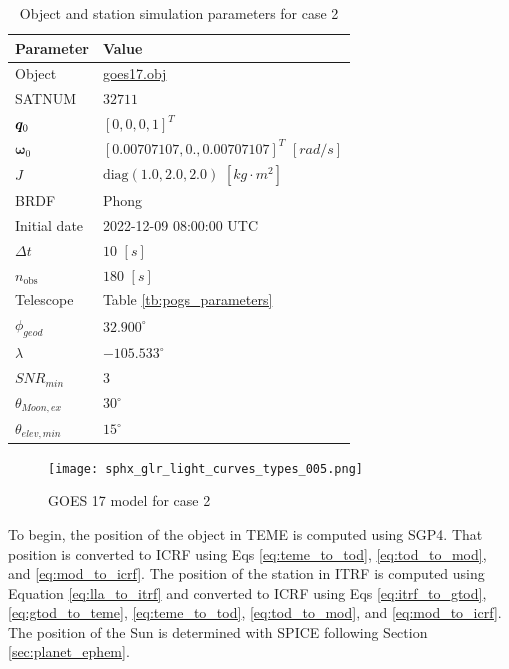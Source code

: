 \begin{table}[]
  \centering
  \caption{Object and station simulation parameters for case 2}
  \vspace*{6pt}
  \begin{tabular}{|l|l|}
  \hline
  \textbf{Parameter} & \textbf{Value} \\ \hline
  Object & \href{https://raw.githubusercontent.com/liamrobinson1/Light-Curve-Models/main/accurate_sats/matlib_goes17.obj}{goes17.obj} \\ \hline
  SATNUM & $32711$ \\ \hline
  $\bm{q}_0$ & $\left[ 0, 0, 0, 1 \right]^T$ \\ \hline
  $\boldsymbol{\omega}_0$ & $\left[ 0.00707107, 0.,         0.00707107 \right]^T$ $[rad/s]$ \\ \hline
  $J$ & $\mathrm{diag}\left( 1.0, 2.0, 2.0 \right)$ $\left[ kg \cdot m^2 \right]$ \\ \hline
  BRDF & Phong \\ \hline
  Initial date & 2022-12-09 08:00:00 UTC \\ \hline
  $\Delta t$ & $10$ $[s]$ \\ \hline
  $n_\mathrm{obs}$ & $180$ $[s]$ \\ \hline
  Telescope & Table \ref{tb:pogs_parameters} \\ \hline
  $\phi_{geod}$ & $32.900^\circ$ \\ \hline
  $\lambda$ & $-105.533^\circ$ \\ \hline
  $SNR_{min}$ & $3$ \\ \hline
  $\theta_{Moon,ex}$ & $30^\circ$ \\ \hline
  $\theta_{elev,min}$ & $15^\circ$ \\ \hline
  \end{tabular}
  \label{tb:case2_obj_props}
\end{table}

\begin{figure}[!htb]
  \centering
  \texttt{[image: sphx\_glr\_light\_curves\_types\_005.png]}
  \caption{GOES 17 model for case 2}
  \label{fig:case2_obj}
\end{figure}

To begin, the position of the object in TEME is computed using SGP4. That position is converted to ICRF using Eqs \ref{eq:teme_to_tod}, \ref{eq:tod_to_mod}, and \ref{eq:mod_to_icrf}. The position of the station in ITRF is computed using Equation \ref{eq:lla_to_itrf} and converted to ICRF using Eqs \ref{eq:itrf_to_gtod}, \ref{eq:gtod_to_teme}, \ref{eq:teme_to_tod}, \ref{eq:tod_to_mod}, and \ref{eq:mod_to_icrf}. The position of the Sun is determined with SPICE following Section \ref{sec:planet_ephem}. 

